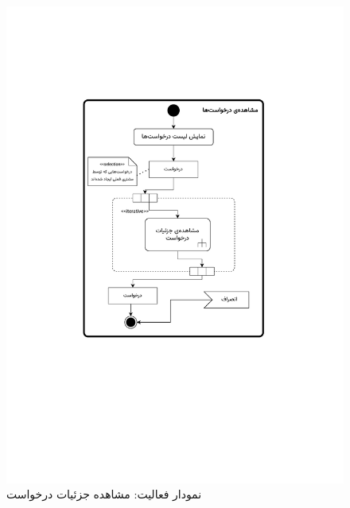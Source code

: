 \begin{figure}
	\centering
	\includegraphics[scale=0.8, page=2]{figs/OOD-activity11-20.pdf}
	\caption{نمودار فعالیت: مشاهده جزئیات درخواست}
\end{figure}
\FloatBarrier
\newpage

